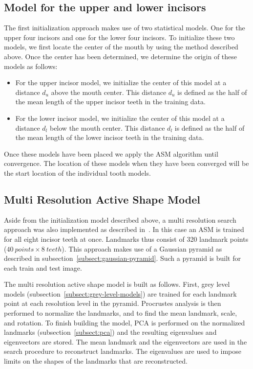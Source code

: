 \documentclass[a4paper]{article}
\begin{document}
\subsection{Model for the upper and lower incisors}
\label{subsect:upper-lower-incisors}
The first initialization approach makes use of two statistical models. 
One for the upper four incisors and one for the lower four incisors.
To initialize these two models, we first locate the center of the mouth by using the method described above.
Once the center has been determined, we determine the origin of these models as follows:
\begin{itemize}
\item For the upper incisor model, we initialize the center of this model at a distance $d_u$ above the mouth center.
This distance $d_u$ is defined as the half of the mean length of the upper incisor teeth in the training data.
\item For the lower incisor model, we initialize the center of this model at a distance $d_l$ below the mouth center.
This distance $d_l$ is defined as the half of the mean length of the lower incisor teeth in the training data.
\end{itemize}
Once these models have been placed we apply the ASM algorithm until convergence.
The location of these models when they have been converged will be the start location of the individual tooth models.

\subsection{Multi Resolution Active Shape Model}
\label{subsect:multi-res}
Aside from the initialization model described above, a multi resolution search approach was also implemented as described in~\cite{Cootes1992AnIT}. 
In this case an ASM is trained for all eight incisor teeth at once.
Landmarks thus consist of 320 landmark points ($40\ points \times 8\ teeth$).
This approach makes use of a Gaussian pyramid as described in subsection~\ref{subsect:gaussian-pyramid}. 
Such a pyramid is built for each train and test image. 

The multi resolution active shape model is built as follows.
First, grey level models (subsection~\ref{subsect:grey-level-models}) are trained for each landmark point at each resolution level in the pyramid. 
Procrustes analysis is then performed to normalize the landmarks, and to find the mean landmark, scale, and rotation.
To finish building the model, PCA is performed on the normalized landmarks (subsection~\ref{subsect:pca}) and the resulting eigenvalues and eigenvectors are stored. 
The mean landmark and the eigenvectors are used in the search procedure to reconstruct landmarks. 
The eigenvalues are used to impose limits on the shapes of the landmarks that are reconstructed.
\end{document}

